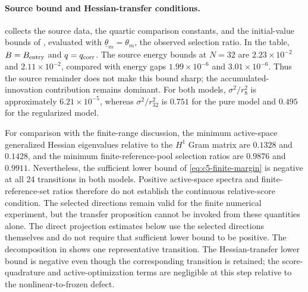 \paragraph{Source bound and Hessian-transfer conditions.}
 collects the source data, the quartic comparison
constants, and the initial-value bounds of , evaluated with
\(\underline\theta_m=\theta_m\), the observed selection ratio. In the table,
\(B=B_{\rm entry}\) and \(q=q_{\rm corr}\). The source energy
bounds at \(N=32\) are \(2.23\times10^{-2}\) and \(2.11\times10^{-2}\), compared with
energy gaps \(1.99\times10^{-6}\) and \(3.01\times10^{-6}\). Thus the source remainder
does not make this bound sharp; the accumulated-innovation contribution remains dominant.
For both models, \(\sigma^2/r_8^2\) is approximately \(6.21\times10^{-5}\), whereas
\(\sigma^2/r_{32}^2\) is \(0.751\) for the pure model and \(0.495\) for the regularized model.



For comparison with the finite-range discussion, the minimum active-space generalized Hessian
eigenvalues relative to the \(H^1\) Gram matrix are \(0.1328\) and \(0.1428\), and the
minimum finite-reference-pool selection ratios are \(0.9876\) and \(0.9911\).
Nevertheless, the sufficient lower bound of \cref{eq:c5-finite-margin} is negative at all 24
transitions in both models. Positive active-space spectra and finite-reference-set ratios therefore do
not establish the continuous relative-score condition. The selected directions remain valid for the
finite numerical experiment, but the transfer proposition cannot be invoked from these quantities alone.
The direct projection estimates below use the selected directions themselves and do not require that
sufficient lower bound to be positive.
The decomposition in  shows one representative transition.  The Hessian-transfer lower bound is negative even though the corresponding transition is retained; the score-quadrature and active-optimization terms are negligible at this step relative to the nonlinear-to-frozen defect.


